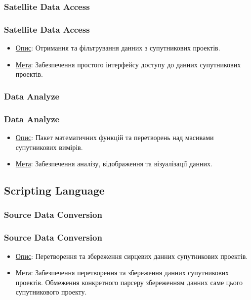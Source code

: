 \documentclass[final,12pt,aspectratio=43]{beamer}
\begin{document}
\subsubsection{Satellite Data Access}
\begin{frame}
    \frametitle{Satellite Data Access} 
    \begin{itemize}
        \item \colorbox{light-blue}{\underline{Опис}:} Отримання та фільтрування данних з супутникових проектів.
        \item \colorbox{light-blue}{\underline{Мета}:} Забезпечення простого інтерфейсу доступу до данних супутникових проектів.
    \end{itemize}
\end{frame}

\subsubsection{Data Analyze}
\begin{frame}
    \frametitle{Data Analyze}
    \begin{itemize}
        \item \colorbox{light-blue}{\underline{Опис}:} Пакет математичних функцій та перетворень над масивами супутникових вимірів.
        \item \colorbox{light-blue}{\underline{Мета}:} Забезпечення аналізу, відображення та візуалізації данних.
    \end{itemize}
\end{frame}

\subsection{Scripting Language}
\subsubsection{Source Data Conversion}
\begin{frame}
    \frametitle{Source Data Conversion}
    \begin{itemize}
        \item \colorbox{light-blue}{\underline{Опис}:} Перетворення та збереження сирцевих данних супутникових проектів.
        \item \colorbox{light-blue}{\underline{Мета}:} Забезпечення перетворення та збереження данних супутникових проектів. Обмеження конкретного парсеру збереженням данних саме цього супутникового проекту.
    \end{itemize}
\end{frame}
\end{document}
